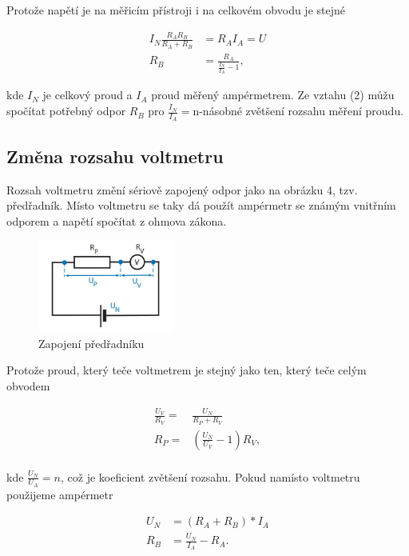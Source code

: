 \documentclass[a4paper,11pt]{article}
\begin{document}
Protože napětí je na měřicím přístroji i na celkovém obvodu je stejné

\begin{align}
  I_N \frac{R_A R_B}{R_A + R_B} &= R_AI_A = U \\
  R_B &= \frac{R_A}{\frac{I_N}{I_A} - 1},
\end{align}

\noindent
kde $I_N$ je celkový proud a $I_A$ proud měřený ampérmetrem. Ze vztahu (2) můžu spočítat potřebný odpor $R_B$ pro $\frac{I_N}{I_A}=$n-násobné zvětšení rozsahu měření proudu.

\subsection{Změna rozsahu voltmetru}

Rozsah voltmetru změní sériově zapojený odpor jako na obrázku 4, tzv. předřadník. 
Místo voltmetru se taky dá použít ampérmetr se známým vnitřním odporem a napětí spočítat z ohmova zákona.

\newpage

\begin{figure}[htpb]
  \centering
  \includegraphics[width=0.4\textwidth]{preradnik.jpg}
  \caption{Zapojení předřadníku}
  \label{fig:}
\end{figure}

Protože proud, který teče voltmetrem je stejný jako ten, který teče celým obvodem

\begin{align}
  \frac{U_V}{R_V} =& \frac{U_N}{R_P + R_V} \\
  R_P =& (\frac{U_N}{U_V} - 1) R_V, \\ 
\end{align}

\noindent
kde $\frac{U_N}{U_A} = n$, což je koeficient zvětšení rozsahu. Pokud namísto voltmetru použijeme ampérmetr

\begin{align}
  U_N &= (R_A + R_B) * I_A \\
  R_B &= \frac{U_N}{I_A} - R_A.
\end{align}
\end{document}
